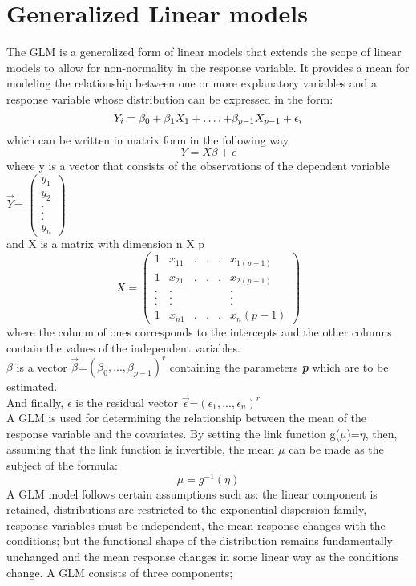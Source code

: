 \section{Generalized Linear models}
The GLM is a generalized form of linear models that extends the scope of linear models to allow for non-normality in the response variable. It provides a mean for modeling the relationship between one or more explanatory variables and a response variable whose distribution can be expressed in the form: 
\begin{equation}
	\centering
	Y_i =\beta_0 + \beta_1 X_1 + \ldots, + \beta_{p-1}X_{p-1}+\epsilon_{i} 
\end{equation}
which can be written in matrix form in the following way
\begin{equation}
	Y=X\beta + \epsilon
\end{equation}
where y is a vector that consists of the observations of the dependent variable\\
$\vec{Y}$= $ \begin{pmatrix}
	y_1 \\
	y_2 \\
	. \\
	. \\
	. \\
	y_n 
\end{pmatrix}  $\\
and X is a matrix with dimension n X p
\begin{equation}
	X= \begin{pmatrix}
		1 & x_{11} & . & . & . & x_{1(p-1)} \\
		1 & x_{21} & . & . & . & x_{2(p-1)} \\
		. & . &  &  &  & . \\
		. & . &  &  &  & . \\
		. & . &  &  &  & . \\
		1 & x_{n1} & . & . & . & x_n{(p-1)} 
	\end{pmatrix}
\end{equation}
where the column of ones corresponds to the intercepts and the other columns contain the values of the independent variables.\\
$\beta$ is a vector $\vec{\beta}$=$(\beta_0,...,\beta_{p-1})^{r}$ containing the parameters \textit{\textbf{p}} which are to be estimated.\\
And finally, \textbf{$\epsilon$} is the residual vector $\vec{\epsilon}$=$(\epsilon_{1},...,\epsilon_{n})^{r}$\\
A GLM is used for determining the relationship between the mean of the response variable and the covariates. By setting the link function g($\mu$)=$\eta$, then, assuming that the link function is invertible, the mean $\mu$ can be made as the subject of the formula:
\begin{equation}
	\mu=g^{-1}(\eta)
\end{equation}
A GLM model follows certain assumptions such as: the linear component is retained, distributions are restricted to the exponential dispersion family, response variables must be independent, the mean response changes with the conditions; but the functional shape of the distribution remains fundamentally unchanged and the mean response changes in some linear way as the conditions change.
A GLM consists of three components;
